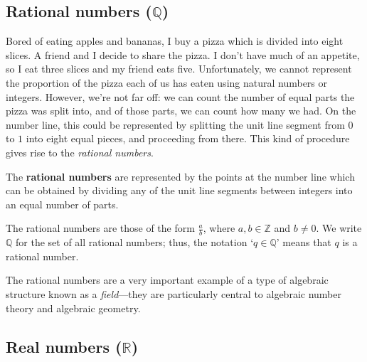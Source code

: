 \subsection*{Rational numbers ($\mathbb{Q}$)}

Bored of eating apples and bananas, I buy a pizza which is divided into eight slices. A friend and I decide to share the pizza. I don't have much of an appetite, so I eat three slices and my friend eats five. Unfortunately, we cannot represent the proportion of the pizza each of us has eaten using natural numbers or integers. However, we're not far off: we can count the number of equal parts the pizza was split into, and of those parts, we can count how many we had. On the number line, this could be represented by splitting the unit line segment from $0$ to $1$ into eight equal pieces, and proceeding from there. This kind of procedure gives rise to the \textit{rational numbers}.

\begin{definition}
\label{defRationalsInformal}
The \textbf{rational numbers} are represented by the points at the number line which can be obtained by dividing any of the unit line segments between integers into an equal number of parts.
\begin{center}
\end{center}
The rational numbers are those of the form $\frac{a}{b}$, where $a,b \in \mathbb{Z}$ and $b \ne 0$. We write $\mathbb{Q}$  for the set of all rational numbers; thus, the notation `$q \in \mathbb{Q}$' means that $q$ is a rational number.
\end{definition}

The rational numbers are a very important example of a type of algebraic structure known as a \textit{field}---they are particularly central to algebraic number theory and algebraic geometry.

\subsection*{Real numbers ($\mathbb{R}$)}

